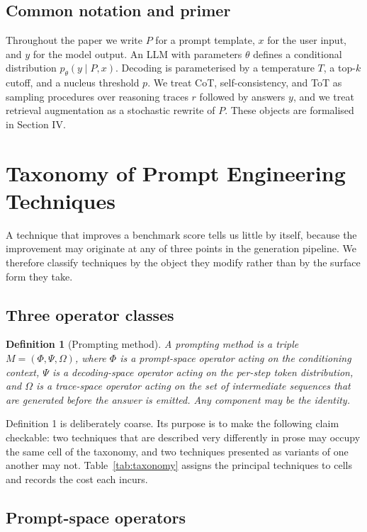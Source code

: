 \documentclass[conference]{IEEEtran}
\begin{document}
\subsection{Common notation and primer}
\label{sec:notation}

Throughout the paper we write $P$ for a prompt template, $x$ for the user input, and $y$ for the model output. An LLM with parameters $\theta$ defines a conditional distribution $p_\theta(y \mid P, x)$. Decoding is parameterised by a temperature $T$, a top-$k$ cutoff, and a nucleus threshold $p$. We treat CoT, self-consistency, and ToT as sampling procedures over reasoning traces $r$ followed by answers $y$, and we treat retrieval augmentation as a stochastic rewrite of $P$. These objects are formalised in Section IV.

\section{Taxonomy of Prompt Engineering Techniques}
\label{sec:taxonomy}

A technique that improves a benchmark score tells us little by itself, because the improvement may originate at any of three points in the generation pipeline. We therefore classify techniques by the object they modify rather than by the surface form they take.

\subsection{Three operator classes}

\textbf{Definition 1} (Prompting method). \textit{A prompting method is a triple $M = (\Phi, \Psi, \Omega)$, where $\Phi$ is a prompt-space operator acting on the conditioning context, $\Psi$ is a decoding-space operator acting on the per-step token distribution, and $\Omega$ is a trace-space operator acting on the set of intermediate sequences that are generated before the answer is emitted. Any component may be the identity.}

Definition 1 is deliberately coarse. Its purpose is to make the following claim checkable: two techniques that are described very differently in prose may occupy the same cell of the taxonomy, and two techniques presented as variants of one another may not. Table~\ref{tab:taxonomy} assigns the principal techniques to cells and records the cost each incurs.

\subsection{Prompt-space operators}
\end{document}
